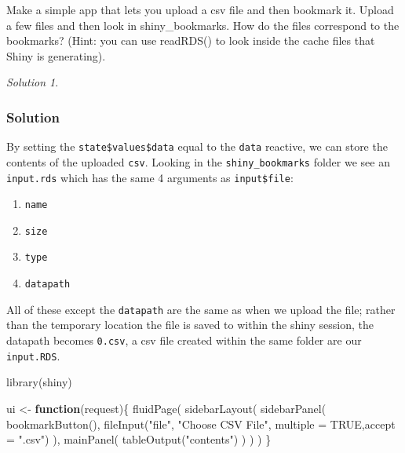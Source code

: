 \documentclass[
]{book}
\newenvironment{Shaded}{\begin{snugshade}}{\end{snugshade}}
\newcommand{\AttributeTok}[1]{\textcolor[rgb]{0.77,0.63,0.00}{#1}}
\newcommand{\ConstantTok}[1]{\textcolor[rgb]{0.00,0.00,0.00}{#1}}
\newcommand{\ControlFlowTok}[1]{\textcolor[rgb]{0.13,0.29,0.53}{\textbf{#1}}}
\newcommand{\FunctionTok}[1]{\textcolor[rgb]{0.00,0.00,0.00}{#1}}
\newcommand{\NormalTok}[1]{#1}
\newcommand{\OtherTok}[1]{\textcolor[rgb]{0.56,0.35,0.01}{#1}}
\newcommand{\StringTok}[1]{\textcolor[rgb]{0.31,0.60,0.02}{#1}}
\providecommand{\tightlist}{%
  \setlength{\itemsep}{0pt}\setlength{\parskip}{0pt}}
\theoremstyle{definition}
\theoremstyle{definition}
\theoremstyle{definition}
\theoremstyle{definition}
\theoremstyle{remark}
\newtheorem*{solution}{Solution}
\begin{document}
Make a simple app that lets you upload a csv file and then bookmark it. Upload a few files and then look in shiny\_bookmarks. How do the files correspond to the bookmarks? (Hint: you can use readRDS() to look inside the cache files that Shiny is generating).

\begin{solution}
\leavevmode

\hypertarget{solution-42}{%
\subsubsection*{Solution}\label{solution-42}}

By setting the \texttt{state\$values\$data} equal to the \texttt{data} reactive, we can store the contents of the uploaded \texttt{csv}. Looking in the \texttt{shiny\_bookmarks} folder we see an \texttt{input.rds} which has the same 4 arguments as \texttt{input\$file}:

\begin{enumerate}
\def\labelenumi{\arabic{enumi}.}
\tightlist
\item
  \texttt{name}
\item
  \texttt{size}
\item
  \texttt{type}
\item
  \texttt{datapath}
\end{enumerate}

All of these except the \texttt{datapath} are the same as when we upload the file; rather than the temporary location the file is saved to within the shiny session, the datapath becomes \texttt{0.csv}, a csv file created within the same folder are our \texttt{input.RDS}.

\begin{Shaded}
\begin{Highlighting}[]
\FunctionTok{library}\NormalTok{(shiny)}

\NormalTok{ui }\OtherTok{\textless{}{-}} \ControlFlowTok{function}\NormalTok{(request)\{}
    \FunctionTok{fluidPage}\NormalTok{(}
        \FunctionTok{sidebarLayout}\NormalTok{(}
            \FunctionTok{sidebarPanel}\NormalTok{(}
                \FunctionTok{bookmarkButton}\NormalTok{(),}
                \FunctionTok{fileInput}\NormalTok{(}\StringTok{"file"}\NormalTok{, }\StringTok{"Choose CSV File"}\NormalTok{, }\AttributeTok{multiple =} \ConstantTok{TRUE}\NormalTok{,}\AttributeTok{accept =} \StringTok{".csv"}\NormalTok{)}
\NormalTok{                ),}
            \FunctionTok{mainPanel}\NormalTok{(}
                \FunctionTok{tableOutput}\NormalTok{(}\StringTok{"contents"}\NormalTok{)}
\NormalTok{            )}
\NormalTok{        )}
\NormalTok{    )}
\NormalTok{\}}



\end{Highlighting}
\end{Shaded}
\end{solution}
\end{document}
